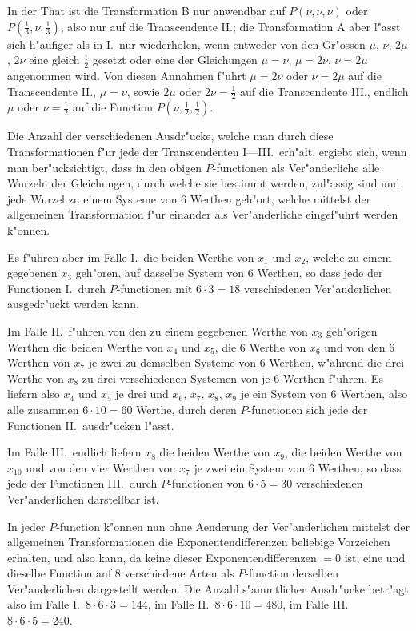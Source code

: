\documentclass[12pt,a4paper]{book}
\theoremstyle{definition}
\theoremstyle{remark}
\begin{document}
In der That ist die Transformation B nur anwendbar auf $P(\nu, \nu, \nu)$ oder $P(\frac{1}{3}, \nu, \frac{1}{3})$, also nur auf die Transcendente II.; die Transformation A aber l{"a}sst sich h{"a}ufiger als in I.\ nur wiederholen, wenn entweder von den Gr{"o}ssen $\mu$, $\nu$, $2\mu$, $2\nu$ eine gleich $\frac{1}{2}$ gesetzt oder eine der Gleichungen $\mu = \nu$, $\mu = 2\nu$, $\nu = 2\mu$ angenommen wird. Von diesen Annahmen f{"u}hrt $\mu = 2\nu$ oder $\nu = 2\mu$ auf die Transcendente II., $\mu = \nu$, sowie $2\mu$ oder $2\nu = \frac{1}{2}$ auf die Transcendente III., endlich $\mu$ oder $\nu = \frac{1}{2}$ auf die Function $P(\nu, \frac{1}{2}, \frac{1}{2})$.

Die Anzahl der verschiedenen Ausdr{"u}cke, welche man durch diese Transformationen f{"u}r jede der Transcendenten I---III.\ erh{"a}lt, ergiebt sich, wenn man ber{"u}cksichtigt, dass in den obigen $P$-functionen als Ver{"a}nderliche alle Wurzeln der Gleichungen, durch welche sie bestimmt werden, zul{"a}ssig sind und jede Wurzel zu einem Systeme von 6 Werthen geh{"o}rt, welche mittelst der allgemeinen Transformation f{"u}r einander als Ver{"a}nderliche eingef{"u}hrt werden k{"o}nnen.

Es f{"u}hren aber im Falle I.\ die beiden Werthe von $x_1$ und $x_2$, welche zu einem gegebenen $x_3$ geh{"o}ren, auf dasselbe System von 6 Werthen, so dass jede der Functionen I.\ durch $P$-functionen mit $6 \cdot 3 = 18$ verschiedenen Ver{"a}nderlichen ausgedr{"u}ckt werden kann.

Im Falle II.\ f{"u}hren von den zu einem gegebenen Werthe von $x_3$ geh{"o}rigen Werthen die beiden Werthe von $x_4$ und $x_5$, die 6 Werthe von $x_6$ und von den 6 Werthen von $x_7$ je zwei zu demselben Systeme von 6 Werthen, w{"a}hrend die drei Werthe von $x_8$ zu drei verschiedenen Systemen von je 6 Werthen f{"u}hren. Es liefern also $x_4$ und $x_5$ je drei und $x_6$, $x_7$, $x_8$, $x_9$ je ein System von 6 Werthen, also alle zusammen $6 \cdot 10 = 60$ Werthe, durch deren $P$-functionen sich jede der Functionen II.\ ausdr{"u}cken l{"a}sst.

Im Falle III.\ endlich liefern $x_8$ die beiden Werthe von $x_9$, die beiden Werthe von $x_{10}$ und von den vier Werthen von $x_7$ je zwei ein System von 6 Werthen, so dass jede der Functionen III.\ durch $P$-functionen von $6 \cdot 5 = 30$ verschiedenen Ver{"a}nderlichen darstellbar ist.

In jeder $P$-function k{"o}nnen nun ohne Aenderung der Ver{"a}nderlichen mittelst der allgemeinen Transformationen die Exponentendifferenzen beliebige Vorzeichen erhalten, und also kann, da keine dieser Exponentendifferenzen $= 0$ ist, eine und dieselbe Function auf 8 verschiedene Arten als $P$-function derselben Ver{"a}nderlichen dargestellt werden. Die Anzahl s{"a}mmtlicher Ausdr{"u}cke betr{"a}gt also im Falle I.\ $8 \cdot 6 \cdot 3 = 144$, im Falle II.\ $8 \cdot 6 \cdot 10 = 480$, im Falle III.\ $8 \cdot 6 \cdot 5 = 240$.
\end{document}
